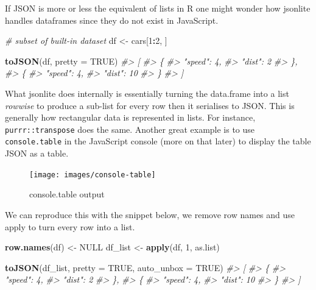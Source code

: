 \documentclass[
  10pt,
]{krantz}
\makeatletter
\newenvironment{Shaded}{\begin{snugshade}}{\end{snugshade}}
\newcommand{\CommentTok}[1]{\textcolor[rgb]{0.37,0.37,0.37}{\textit{#1}}}
\newcommand{\DataTypeTok}[1]{\textcolor[rgb]{0.27,0.27,0.27}{#1}}
\newcommand{\DecValTok}[1]{\textcolor[rgb]{0.06,0.06,0.06}{#1}}
\newcommand{\KeywordTok}[1]{\textcolor[rgb]{0.27,0.27,0.27}{\textbf{#1}}}
\newcommand{\NormalTok}[1]{#1}
\newcommand{\OperatorTok}[1]{\textcolor[rgb]{0.43,0.43,0.43}{\textbf{#1}}}
\newcommand{\OtherTok}[1]{\textcolor[rgb]{0.37,0.37,0.37}{#1}}
\newcommand{\StringTok}[1]{\textcolor[rgb]{0.5,0.5,0.5}{#1}}
\newenvironment{kframe}{%
\medskip{}
\setlength{\fboxsep}{.8em}
 \def\at@end@of@kframe{}%
 \ifinner\ifhmode%
  \def\at@end@of@kframe{\end{minipage}}%
  \begin{minipage}{\columnwidth}%
 \fi\fi%
 \def\FrameCommand##1{\hskip\@totalleftmargin \hskip-\fboxsep
 \colorbox{shadecolor}{##1}\hskip-\fboxsep
     \hskip-\linewidth \hskip-\@totalleftmargin \hskip\columnwidth}%
 \MakeFramed {\advance\hsize-\width
   \@totalleftmargin\z@ \linewidth\hsize
   \@setminipage}}%
 {\par\unskip\endMakeFramed%
 \at@end@of@kframe}
\renewenvironment{Shaded}{\begin{kframe}}{\end{kframe}}
\makeatother
\begin{document}
If JSON is more or less the equivalent of lists in R one might wonder how jsonlite handles dataframes since they do not exist in JavaScript.

\begin{Shaded}
\begin{Highlighting}[]
\CommentTok{\# subset of built{-}in dataset}
\NormalTok{df <{-}}\StringTok{ }\NormalTok{cars[}\DecValTok{1}\OperatorTok{:}\DecValTok{2}\NormalTok{, ]}

\KeywordTok{toJSON}\NormalTok{(df, }\DataTypeTok{pretty =} \OtherTok{TRUE}\NormalTok{)}
\CommentTok{\#> [}
\CommentTok{\#>   \{}
\CommentTok{\#>     "speed": 4,}
\CommentTok{\#>     "dist": 2}
\CommentTok{\#>   \},}
\CommentTok{\#>   \{}
\CommentTok{\#>     "speed": 4,}
\CommentTok{\#>     "dist": 10}
\CommentTok{\#>   \}}
\CommentTok{\#> ]}
\end{Highlighting}
\end{Shaded}

What jsonlite does internally is essentially turning the data.frame into a list \emph{rowwise} to produce a sub-list for every row then it serialises to JSON. This is generally how rectangular data is represented in lists. For instance, \texttt{purrr::transpose} does the same. Another great example is to use \texttt{console.table} in the JavaScript console (more on that later) to display the table JSON as a table.

\begin{figure}[H]

{\centering \texttt{[image: images/console-table]} 

}

\caption{console.table output}\label{fig:console-table}
\end{figure}

We can reproduce this with the snippet below, we remove row names and use apply to turn every row into a list.

\begin{Shaded}
\begin{Highlighting}[]
\KeywordTok{row.names}\NormalTok{(df) <{-}}\StringTok{ }\OtherTok{NULL}
\NormalTok{df\_list <{-}}\StringTok{ }\KeywordTok{apply}\NormalTok{(df, }\DecValTok{1}\NormalTok{, as.list)}

\KeywordTok{toJSON}\NormalTok{(df\_list, }\DataTypeTok{pretty =} \OtherTok{TRUE}\NormalTok{, }\DataTypeTok{auto\_unbox =} \OtherTok{TRUE}\NormalTok{)}
\CommentTok{\#> [}
\CommentTok{\#>   \{}
\CommentTok{\#>     "speed": 4,}
\CommentTok{\#>     "dist": 2}
\CommentTok{\#>   \},}
\CommentTok{\#>   \{}
\CommentTok{\#>     "speed": 4,}
\CommentTok{\#>     "dist": 10}
\CommentTok{\#>   \}}
\CommentTok{\#> ]}
\end{Highlighting}
\end{Shaded}
\end{document}
